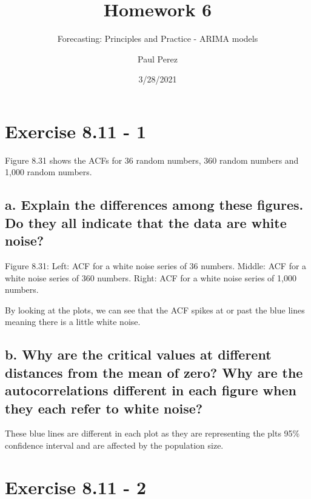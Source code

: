 \documentclass[]{article}
\title{Homework 6}
\subtitle{Forecasting: Principles and Practice - ARIMA models}
\author{Paul Perez}
\date{3/28/2021}
\begin{document}
\maketitle

\hypertarget{exercise-8.11---1}{%
\section{Exercise 8.11 - 1}\label{exercise-8.11---1}}

Figure 8.31 shows the ACFs for 36 random numbers, 360 random numbers and
1,000 random numbers.

\hypertarget{a.-explain-the-differences-among-these-figures.-do-they-all-indicate-that-the-data-are-white-noise}{%
\subsection{a. Explain the differences among these figures. Do they all
indicate that the data are white
noise?}\label{a.-explain-the-differences-among-these-figures.-do-they-all-indicate-that-the-data-are-white-noise}}

Figure 8.31: Left: ACF for a white noise series of 36 numbers. Middle:
ACF for a white noise series of 360 numbers. Right: ACF for a white
noise series of 1,000 numbers.

By looking at the plots, we can see that the ACF spikes at or past the
blue lines meaning there is a little white noise.

\hypertarget{b.-why-are-the-critical-values-at-different-distances-from-the-mean-of-zero-why-are-the-autocorrelations-different-in-each-figure-when-they-each-refer-to-white-noise}{%
\subsection{b. Why are the critical values at different distances from
the mean of zero? Why are the autocorrelations different in each figure
when they each refer to white
noise?}\label{b.-why-are-the-critical-values-at-different-distances-from-the-mean-of-zero-why-are-the-autocorrelations-different-in-each-figure-when-they-each-refer-to-white-noise}}

These blue lines are different in each plot as they are representing the
plts 95\% confidence interval and are affected by the population size.

\newpage

\hypertarget{exercise-8.11---2}{%
\section{Exercise 8.11 - 2}\label{exercise-8.11---2}}
\end{document}
